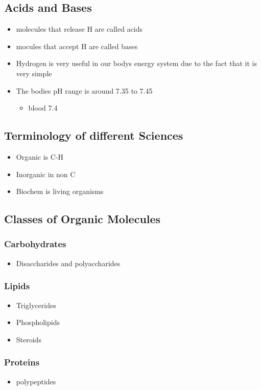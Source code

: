 \documentclass[11pt]{article}
\begin{document}
\subsection{Acids and Bases}
\label{sec:org20adde6}
\begin{itemize}
\item molecules that release H are called acids
\item mocules that accept H are called bases
\item Hydrogen is very useful in our bodys energy system due to the fact that it is very simple
\item The bodies pH range is around 7.35 to 7.45
\begin{itemize}
\item blood 7.4
\end{itemize}
\end{itemize}
\subsection{Terminology of different Sciences}
\label{sec:org2fa46a7}
\begin{itemize}
\item Organic is C-H
\item Inorganic in non C
\item Biochem is living organisms
\end{itemize}
\subsection{Classes of Organic Molecules}
\label{sec:org0f4b113}
\subsubsection{Carbohydrates}
\label{sec:orgbb823c6}
\begin{itemize}
\item Disaccharides and polyaccharides
\end{itemize}
\subsubsection{Lipids}
\label{sec:org7456cc4}
\begin{itemize}
\item Triglycerides
\item Phospholipids
\item Steroids
\end{itemize}
\subsubsection{Proteins}
\label{sec:org52cebb7}
\begin{itemize}
\item polypeptides
\end{itemize}
\end{document}
